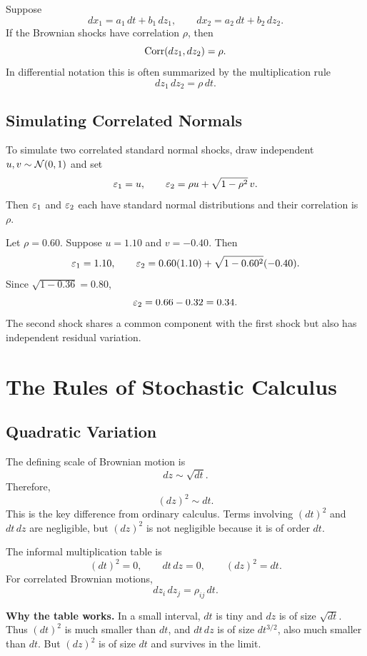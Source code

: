 Suppose
\[
    dx_1=a_1\,dt+b_1\,dz_1,
    \qquad
    dx_2=a_2\,dt+b_2\,dz_2.
\]
If the Brownian shocks have correlation $\rho$, then
\[
    \operatorname{Corr}(dz_1,dz_2)=\rho.
\]
In differential notation this is often summarized by the multiplication rule
\[
    dz_1\,dz_2 = \rho\,dt.
\]

\subsection{Simulating Correlated Normals}

To simulate two correlated standard normal shocks, draw independent
$u,v\sim\mathcal{N}(0,1)$ and set
\[
    \varepsilon_1=u,
    \qquad
    \varepsilon_2=\rho u+\sqrt{1-\rho^2}\,v.
\]
Then $\varepsilon_1$ and $\varepsilon_2$ each have standard normal distributions and their
correlation is $\rho$.

\begin{exmp}
Let $\rho=0.60$. Suppose $u=1.10$ and $v=-0.40$. Then
\[
    \varepsilon_1=1.10,
    \qquad
    \varepsilon_2=0.60(1.10)+\sqrt{1-0.60^2}(-0.40).
\]
Since $\sqrt{1-0.36}=0.80$,
\[
    \varepsilon_2=0.66-0.32=0.34.
\]
The second shock shares a common component with the first shock but also has
independent residual variation.
\end{exmp}

\section{The Rules of Stochastic Calculus}

\subsection{Quadratic Variation}

The defining scale of Brownian motion is
\[
    dz \sim \sqrt{dt}.
\]
Therefore,
\[
    (dz)^2 \sim dt.
\]
This is the key difference from ordinary calculus. Terms involving $(dt)^2$ and
$dt\,dz$ are negligible, but $(dz)^2$ is not negligible because it is of order
$dt$.

The informal multiplication table is
\[
    (dt)^2=0,
    \qquad
    dt\,dz=0,
    \qquad
    (dz)^2=dt.
\]
For correlated Brownian motions,
\[
    dz_i\,dz_j=\rho_{ij}\,dt.
\]

\begin{boxF}
\textbf{Why the table works.} In a small interval, $dt$ is tiny and $dz$ is of
size $\sqrt{dt}$. Thus $(dt)^2$ is much smaller than $dt$, and $dt\,dz$ is of
size $dt^{3/2}$, also much smaller than $dt$. But $(dz)^2$ is of size $dt$ and
survives in the limit.
\end{boxF}


